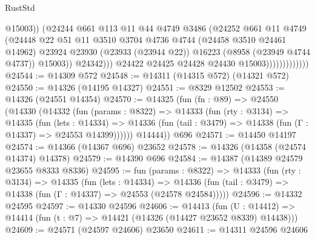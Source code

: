 \begin{lexlean}{RustStd}
\begin{coremodule}
                                      @15003))
                                  (@24244
                                    @661
                                    @113
                                    @11
                                    @44
                                    @4749
                                    @3486
                                    (@24252
                                      @661
                                      @11
                                      @4749
                                      (@24448
                                        @22
                                        @51
                                        @11
                                        @3510
                                        @3704
                                        @4736
                                        @4744
                                        (@24458 @3510 @24461 @14962)
                                        @23924
                                        @23930
                                        (@23933 (@23944 @22))
                                        @16223
                                        (@8958 (@23949 @4744 @4737))
                                        @15003))
                                    @24342)))
                              @24422
                              @24425
                              @24428
                              @24430
                              @15003)))))))))))))
@24544 := @14309 @572
@24548 := @14311 (@14315 @572) (@14321 @572)
@24550 := @14326 (@14195 @14327)
@24551 := @8329 @12502
@24553 := @14326 (@24551 @14354)
@24570 := @14325
    (fun (fn : @89) =>
    @24550
      (@14330
        (@14332
          (fun (params : @8322) =>
          @14333
            (fun (rty : @3134) =>
            @14335
              (fun (lets : @14334) =>
              @14336 (fun (tail : @3479) => @14338 (fun (Γ : @14337) => @24553 @14399))))))
        @14444))
    @696
@24571 := @14450 @14197
@24574 := @14366 (@14367 @696) @23652
@24578 := @14326 (@14358 (@24574 @14374) @14378)
@24579 := @14390 @696
@24584 := @14387 (@14389 @24579 @23655 @8333 @8336)
@24595 := fun (params : @8322) =>
  @14333
    (fun (rty : @3134) =>
    @14335
      (fun (lets : @14334) =>
      @14336 (fun (tail : @3479) => @14338 (fun (Γ : @14337) => @24553 (@24578 @24584)))))
@24596 := @14332 @24595
@24597 := @14330 @24596
@24606 := @14413
    (fun (U : @14412) => @14414 (fun (t : @7) => @14421 (@14326 (@14427 @23652 @8339) @14438)))
@24609 := @24571 (@24597 @24606) @23650
@24611 := @14311 @24596 @24606

\end{coremodule}
\end{lexlean}
